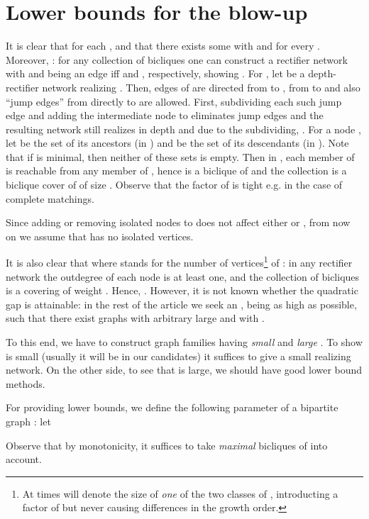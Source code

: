 \documentclass[submission]{llncs}
\begin{document}
\section{Lower bounds for the blow-up}
\label{sec-gap}
  It is clear that  for each , and that there exists some  with  and
   for every . Moreover, : for any collection  of bicliques
  one can construct a rectifier network  with  and  being an edge iff
   and , respectively, showing . For , let
   be a depth- rectifier network realizing .
  Then, edges of  are directed from  to , from  to  and also ``jump edges'' from  directly to  are allowed.
  First, subdividing each such jump edge and adding the intermediate node to  eliminates jump edges and the resulting network
   still realizes  in depth  and due to the subdividing, .
  For a node , let  be the set of its ancestors (in ) and  be the set of its descendants (in ).
  Note that if  is minimal, then neither of these sets is empty.
  Then in , each member of  is reachable from any member of , hence  is a biclique of  and the
  collection  is a biclique cover of  of size .
  Observe that the factor of  is tight e.g. in the case of complete matchings.

  Since adding or removing isolated nodes to  does not affect either  or , from now on we assume that  has no isolated vertices.

  It is also clear that  where  stands for the number of vertices\footnote{At times  will denote the size of \emph{one} of the two classes of , introducting a factor of  but never causing differences in the growth order.} of :
  in any rectifier network the outdegree of each node  is at least one, and the collection  of bicliques
  is a covering of weight . Hence, .
  However, it is not known whether the quadratic gap is attainable: in the rest of the article we seek an , being as high as possible,
  such that there exist graphs with arbitrary large  and with .

  To this end, we have to construct graph families having \emph{small}  and \emph{large} .
  To show  is small (usually it will be  in our candidates) it suffices to give a small realizing network.
  On the other side, to see that  is large, we should have good lower bound methods.

  For providing lower bounds, we define the following parameter  of a bipartite graph : let
  
  Observe that by monotonicity, it suffices to take \emph{maximal} bicliques of  into account.
\end{document}
